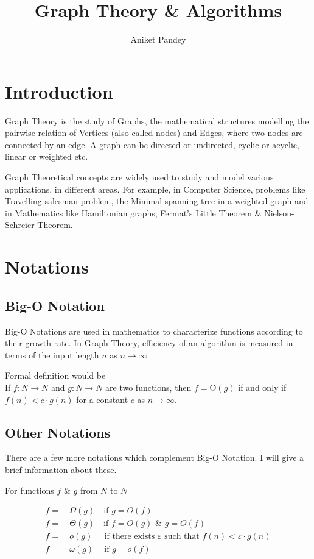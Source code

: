 \documentclass[11pt,a4paper]{extarticle}
\title{\textbf{Graph Theory \& Algorithms}}
\author{Aniket Pandey}
\begin{document}
\maketitle

\section{Introduction}
Graph Theory is the study of Graphs, the mathematical structures modelling the pairwise relation of Vertices (also called nodes) and Edges, where two nodes are connected by an edge. A graph can be directed or undirected, cyclic or acyclic, linear or weighted etc. 

Graph Theoretical concepts are widely used to study and model various applications, in different areas. For example, in Computer Science, problems like Travelling salesman problem, the Minimal spanning tree in a weighted graph and in Mathematics like Hamiltonian graphs, Fermat's Little Theorem \& Nielson-Schreier Theorem. 

\section{Notations}
\subsection{Big-O Notation}
Big-O Notations are used in mathematics to characterize functions according to their growth rate. In Graph Theory, efficiency of an algorithm is measured in terms of the input length $n$ as $n\rightarrow \infty $.\par Formal definition would be\\If $f:N\rightarrow N$ and $g:N\rightarrow N$ are two functions, then $f=$O$(g)$ if and only if $f(n)<c \cdot g(n)$ for a constant $c$ as $n\rightarrow\infty$.
\subsection{Other Notations}
There are a few more notations which complement Big-O Notation. I will give a brief information about these.\par
For functions $f$ \& $g$ from $N$ to $N$

\begin{align}
f =&\:\Omega(g)\quad  \textrm{if} \,\,  g=O(f)\\
f =&\:\Theta(g)\quad \textrm{if} \,\,  f=O(g) \,\, \& \,\, g=O(f)\\
f =&\:o(g)\:\,\quad \textrm{if there exists }\varepsilon \textrm{ such that} \,\, f(n)<\varepsilon\cdot g(n) \\
f =&\:\omega(g)\quad \:\textrm{if} \,\,  g=o(f)
\end{align}
\end{document}
